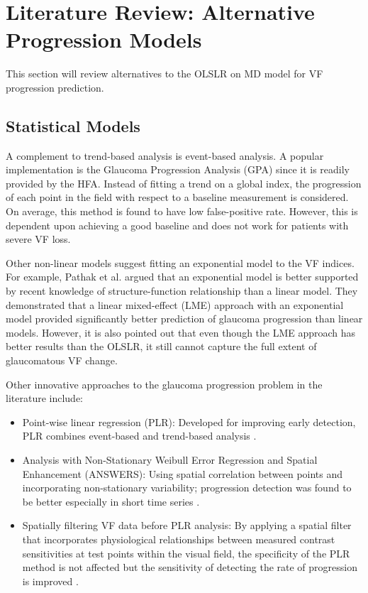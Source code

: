 \section{Literature Review: Alternative Progression Models}

This section will review alternatives to the \ac{OLSLR} on MD model for \acl{VF} progression prediction. 

\subsection{Statistical Models}

A complement to trend-based analysis is event-based analysis. A popular implementation is the Glaucoma Progression Analysis (GPA) since it is readily provided by the \ac{HFA}. Instead of fitting a trend on a global index, the progression of each point in the field with respect to a baseline measurement is considered. On average, this method is found to have low false-positive rate. However, this is dependent upon achieving a good baseline and does not work for patients with severe \acl{VF} loss. \cite{Aref2017}

Other non-linear models suggest fitting an exponential model to the \acl{VF} indices. For example, Pathak et al. argued that an exponential model is better supported by recent knowledge of structure-function relationship than a linear model. \cite{Pathak2013} They demonstrated that a linear mixed-effect (LME) approach with an exponential model provided significantly better prediction of glaucoma progression than linear models. However, it is also pointed out that even though the LME approach has better results than the \ac{OLSLR}, it still cannot capture the full extent of glaucomatous \acl{VF} change.

Other innovative approaches to the glaucoma progression problem in the literature include:

\begin{itemize}
	\item Point-wise linear regression (PLR): Developed for improving early detection, PLR combines event-based and trend-based analysis \cite{Nouri-Mahdavi2005}. 
	\item Analysis with Non-Stationary Weibull Error Regression and Spatial Enhancement (ANSWERS): Using spatial correlation between points and incorporating non-stationary variability; progression detection was found to be better especially in short time series \cite{Zhu2015}.
	\item Spatially filtering \acl{VF} data before PLR analysis: By applying a spatial filter that incorporates physiological relationships between measured contrast sensitivities at test points within the visual field, the specificity of the PLR method is not affected but the sensitivity of detecting the rate of progression is improved \cite{Strouthidis}.
\end{itemize}

